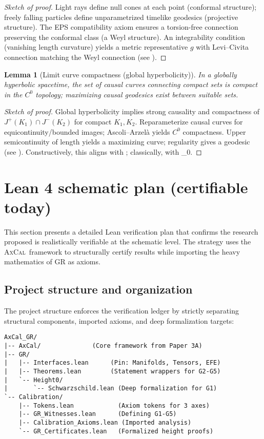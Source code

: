 \documentclass[11pt]{article}
\newtheorem{lemma}[theorem]{Lemma}
\theoremstyle{definition}
\theoremstyle{remark}
\newcommand{\FT}{\mathrm{FT}}
\newcommand{\WKLz}{\mathrm{WKL}_0}
\newcommand{\AxCal}{\textsc{AxCal}}
\begin{document}
\begin{proof}[Sketch of proof]
Light rays define null cones at each point (conformal structure); freely falling particles define unparametrized timelike geodesics (projective structure). The EPS compatibility axiom ensures a torsion-free connection preserving the conformal class (a Weyl structure). An integrability condition (vanishing length curvature) yields a metric representative $g$ with Levi–Civita connection matching the Weyl connection (see \cite{EPS1972}).
\end{proof}

\begin{lemma}[Limit curve compactness (global hyperbolicity)]\label{lem:limitcurve}
In a globally hyperbolic spacetime, the set of causal curves connecting compact sets is compact in the $C^0$ topology; maximizing causal geodesics exist between suitable sets.
\end{lemma}

\begin{proof}[Sketch of proof]
Global hyperbolicity implies strong causality and compactness of $J^+(K_1)\cap J^-(K_2)$ for compact $K_1,K_2$. Reparameterize causal curves for equicontinuity/bounded images; Ascoli–Arzelà yields $C^0$ compactness. Upper semicontinuity of length yields a maximizing curve; regularity gives a geodesic (see \cite[§14]{Wald1984}). Constructively, this aligns with \FT; classically, with \WKLz.
\end{proof}

\section{Lean 4 schematic plan (certifiable today)}

This section presents a detailed Lean verification plan that confirms the research proposed is realistically verifiable at the schematic level. The strategy uses the \AxCal\ framework to structurally certify results while importing the heavy mathematics of GR as axioms.

\subsection{Project structure and organization}

The project structure enforces the verification ledger by strictly separating structural components, imported axioms, and deep formalization targets:

\begin{lstlisting}[caption={Project directory structure}]
AxCal_GR/
|-- AxCal/              (Core framework from Paper 3A)
|-- GR/
|   |-- Interfaces.lean      (Pin: Manifolds, Tensors, EFE)
|   |-- Theorems.lean        (Statement wrappers for G2-G5)
|   `-- Height0/
|       `-- Schwarzschild.lean (Deep formalization for G1)
`-- Calibration/
    |-- Tokens.lean            (Axiom tokens for 3 axes)
    |-- GR_Witnesses.lean      (Defining G1-G5)
    |-- Calibration_Axioms.lean (Imported analysis)
    `-- GR_Certificates.lean   (Formalized height proofs)
\end{lstlisting}
\end{document}
